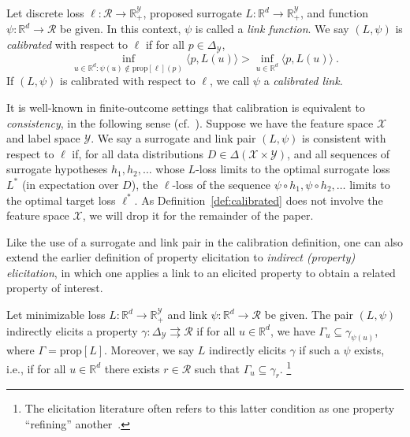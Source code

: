 \documentclass[twoside,11pt]{article}
\newcommand{\reals}{\mathbb{R}}
\newcommand{\prop}[1]{\mathrm{prop}[#1]}
\newcommand{\simplex}{\Delta_\Y}
\newcommand{\R}{\mathcal{R}}
\newcommand{\X}{\mathcal{X}}
\newcommand{\Y}{\mathcal{Y}}
\newcommand{\inprod}[2]{\langle #1, #2 \rangle}%
\newcommand{\toto}{\rightrightarrows}
\begin{document}
\begin{definition}
  \label{def:calibrated}
  Let discrete loss $\ell:\R\to\reals^\Y_+$, proposed surrogate $L:\reals^d\to\reals^\Y_+$, and function $\psi:\reals^d\to\R$ be given.
  In this context, $\psi$ is called a \emph{link function}.
  We say $(L,\psi)$ is \emph{calibrated} with respect to $\ell$ if
for all $p \in \simplex$,
  \begin{equation}
    \label{eq:calibrated}
  \inf_{u \in \reals^d : \psi(u) \not\in \prop{\ell}(p)} \inprod{p}{L(u)} > \inf_{u \in \reals^d} \inprod{p}{L(u)}~.
  \end{equation}
  If $(L, \psi)$ is calibrated with respect to $\ell$, we call $\psi$ a \emph{calibrated link.}
\end{definition}


It is well-known in finite-outcome settings that calibration is equivalent to \emph{consistency}, in the following sense (cf.~\citep{bartlett2006convexity,zhang2004statistical,agarwal2015consistent}).
Suppose we have the feature space $\X$ and label space $\Y$.
We say a surrogate and link pair $(L,\psi)$ is consistent with respect to $\ell$ if, for all data distributions $D \in \Delta(\X \times \Y)$, and all sequences of surrogate hypotheses $h_1,h_2,\ldots$ whose $L$-loss limits to the optimal surrogate loss $L^*$ (in expectation over $D$), the $\ell$-loss of the sequence $\psi\circ h_1,\psi \circ h_2, \ldots$ limits to the optimal target loss $\ell^*$.
As Definition~\ref{def:calibrated} does not involve the feature space $\X$, we will drop it for the remainder of the paper.


Like the use of a surrogate and link pair in the calibration definition, one can also extend the earlier definition of property elicitation to \emph{indirect (property) elicitation}, in which one applies a link to an elicited property to obtain a related property of interest.
\begin{definition}\label{def:indirect-elic}
	Let minimizable loss $L : \reals^d \to \reals^\Y_+$ and link $\psi : \reals^d \to \R$ be given.
  The pair $(L, \psi)$ indirectly elicits a property $\gamma : \simplex \toto \R$ if for all $u \in \reals^d$, we have $\Gamma_u \subseteq \gamma_{\psi(u)}$, where $\Gamma = \prop{L}$.
	Moreover, we say $L$ indirectly elicits $\gamma$ if such a $\psi$ exists, i.e., if for all $u\in\reals^d$ there exists $r\in\R$ such that $\Gamma_u \subseteq \gamma_r$.%
  \footnote{The elicitation literature often refers to this latter condition as one property ``refining'' another~\citep{frongillo2015elicitation}.}
\end{definition}
\end{document}
